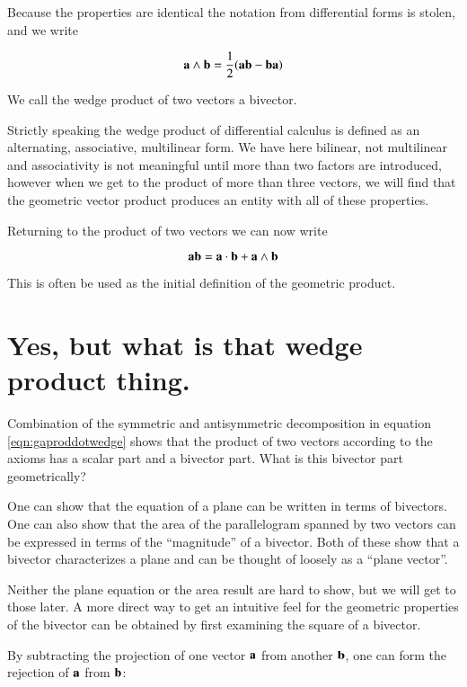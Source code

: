\documentclass{article}      %
\begin{document}
Because the properties are identical the notation from differential forms is stolen, and we write

\begin{equation}\label{eqn:wedge}
\mathbf{a} \wedge \mathbf{b} = \frac{1}{2}(\mathbf{a} \mathbf{b} - \mathbf{b} \mathbf{a})
\end{equation}

We call the wedge product of two vectors a bivector.

Strictly speaking the 
wedge product of differential calculus is defined as an alternating, associative, multilinear form.  We have here bilinear, not multilinear and associativity is
not meaningful until more than two factors are introduced, however when we get to the product of more than three
vectors, we will find that the geometric vector product produces an entity with all of these properties.

Returning to the product of two vectors we can now write

\begin{equation}\label{eqn:gaproddotwedge}
\mathbf{a} \mathbf{b} = \mathbf{a} \cdot \mathbf{b} + \mathbf{a} \wedge \mathbf{b}
\end{equation}

This is often be used as the initial definition of the geometric product.

\section{ Yes, but what is that wedge product thing. }

Combination of the symmetric and antisymmetric decomposition in equation \ref{eqn:gaproddotwedge} shows that the product of two vectors according to the axioms
has a scalar part and a bivector part.  What is this bivector part geometrically?

One can show that the equation of a plane can be written in terms of bivectors.  One can also show that
the area of the parallelogram spanned by two vectors can be expressed in terms of the ``magnitude'' of a bivector.  Both of these
show that a bivector characterizes a plane and can be thought of loosely as a ``plane vector''.

Neither the plane equation or the area result are hard to show, but we will get to those later.  A more direct way to get an
intuitive feel for the geometric properties of the bivector can be obtained by first examining the
square of a bivector.

By subtracting the projection of one vector $\mathbf{a}$ from another $\mathbf{b}$, one can form the rejection of $\mathbf{a}$ from $\mathbf{b}$:
\end{document}
